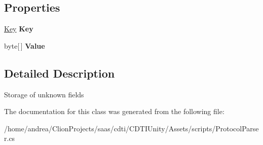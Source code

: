\subsection*{Properties}
\begin{DoxyCompactItemize}
\item 
\hyperlink{class_silent_orbit_1_1_protocol_buffers_1_1_key}{Key} {\bfseries Key}\hypertarget{class_silent_orbit_1_1_protocol_buffers_1_1_key_value_a041f3d9740a6df457ea3c74d2b024b7f}{}\label{class_silent_orbit_1_1_protocol_buffers_1_1_key_value_a041f3d9740a6df457ea3c74d2b024b7f}

\item 
byte\mbox{[}$\,$\mbox{]} {\bfseries Value}\hypertarget{class_silent_orbit_1_1_protocol_buffers_1_1_key_value_a358b40d160e891e8cdd9039d86469f60}{}\label{class_silent_orbit_1_1_protocol_buffers_1_1_key_value_a358b40d160e891e8cdd9039d86469f60}

\end{DoxyCompactItemize}


\subsection{Detailed Description}
Storage of unknown fields 



The documentation for this class was generated from the following file\+:\begin{DoxyCompactItemize}
\item 
/home/andrea/\+Clion\+Projects/saas/cdti/\+C\+D\+T\+I\+Unity/\+Assets/scripts/Protocol\+Parser.\+cs\end{DoxyCompactItemize}
